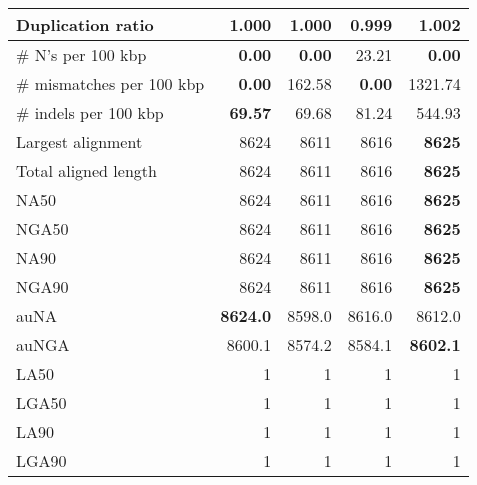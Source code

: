 \documentclass[12pt,a4paper]{article}
\begin{document}
\begin{table}[ht]
\begin{center}
\begin{tabular}{|l*{4}{|r}|}
Duplication ratio & 1.000 & 1.000 & {\bf 0.999} & 1.002 \\ \hline
\# N's per 100 kbp & {\bf 0.00} & {\bf 0.00} & 23.21 & {\bf 0.00} \\ \hline
\# mismatches per 100 kbp & {\bf 0.00} & 162.58 & {\bf 0.00} & 1321.74 \\ \hline
\# indels per 100 kbp & {\bf 69.57} & 69.68 & 81.24 & 544.93 \\ \hline
Largest alignment & 8624 & 8611 & 8616 & {\bf 8625} \\ \hline
Total aligned length & 8624 & 8611 & 8616 & {\bf 8625} \\ \hline
NA50 & 8624 & 8611 & 8616 & {\bf 8625} \\ \hline
NGA50 & 8624 & 8611 & 8616 & {\bf 8625} \\ \hline
NA90 & 8624 & 8611 & 8616 & {\bf 8625} \\ \hline
NGA90 & 8624 & 8611 & 8616 & {\bf 8625} \\ \hline
auNA & {\bf 8624.0} & 8598.0 & 8616.0 & 8612.0 \\ \hline
auNGA & 8600.1 & 8574.2 & 8584.1 & {\bf 8602.1} \\ \hline
LA50 & 1 & 1 & 1 & 1 \\ \hline
LGA50 & 1 & 1 & 1 & 1 \\ \hline
LA90 & 1 & 1 & 1 & 1 \\ \hline
LGA90 & 1 & 1 & 1 & 1 \\ \hline
\end{tabular}
\end{center}
\end{table}
\end{document}
